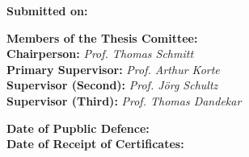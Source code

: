 \documentclass[
12pt, %
english, %
doublespacing, %
headsepline, %
chapterinoneline, %
]{MastersDoctoralThesis} %
\begin{document}
\begin{titlepage}
\begin{center}


 

 
  \end{center}
  \newpage
  
  \vspace{.1\textheight}
  \textbf{Submitted on:} \dotfill\\
  
  \vspace{.1\textheight}
  \begin{centering}
    {\Large\textbf{Members of the Thesis Comittee:}} \\
      \vspace{.1\textheight}
      {\Large
      \textbf{Chairperson: }\textit{Prof. Thomas Schmitt} \\
      \textbf{Primary Supervisor: }\textit{Prof. Arthur Korte} \\
      \textbf{Supervisor (Second):  }\textit{Prof. J\"{o}rg Schultz } \\
      \textbf{Supervisor (Third):  }\textit{Prof. Thomas Dandekar} \\
      }
    \end{centering}
    \vspace{0.2\textheight}
    \noindent
    \textbf{Date of Pupblic Defence:} \dotfill \\
    \textbf{Date of Receipt of Certificates:}\dotfill
  
  
\end{titlepage}

\end{document}

